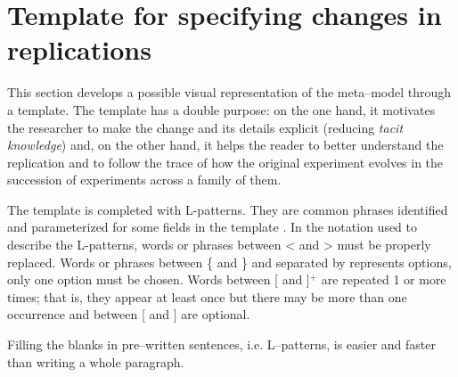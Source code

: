 

\section{Template for specifying changes in replications}
\label{sec:plantilla}

This section develops a possible visual representation of the meta--model through a template. 
The template has a double purpose: on the one hand, it motivates the researcher to make the change and its details explicit (reducing \emph{tacit knowledge}) and, on the other hand, it helps the reader to better understand the replication and to follow the trace of how the original experiment evolves in the succession of experiments across a family of them.

The template is completed with L-patterns. They are common phrases identified and parameterized for some fields in the template \cite{duran2002supporting}.
In the notation used to describe the L-patterns, words or phrases between \textless \hspace{0.5 mm} and \textgreater \hspace{1 mm} must be properly replaced.
Words or phrases between \{ and \} and separated by \textbar \hspace{1 mm} represents options, only one option must be chosen.
Words between [ and ]$^+$ are repeated 1 or more times; that is, they appear at least once but there may be more than one occurrence
and between [ and ] are optional.

Filling the blanks in pre–written sentences, i.e. L–patterns, is easier and faster than writing a whole paragraph. 

